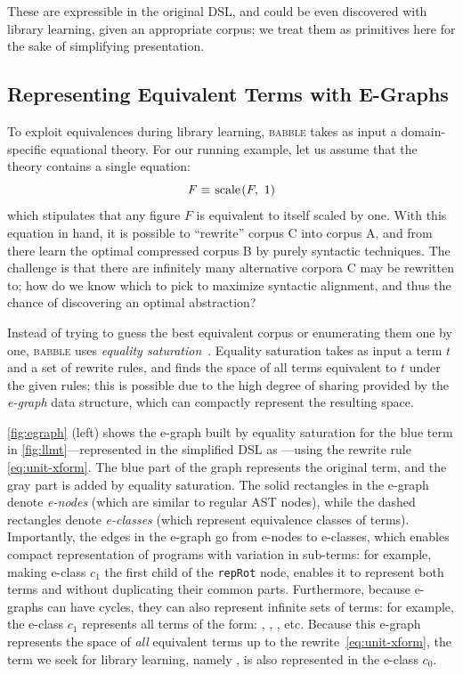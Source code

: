\documentclass[acmsmall,screen,nonacm,review=false,timestamp=false]{acmart}
\newcommand{\tname}[1]{\textsc{#1}\xspace}
\newcommand{\tool}{\tname{babble}}
\newcommand{\T}[1]{\mbox{\lstinline^#1^}}
\newcommand{\semeq}{\equiv}
\begin{document}
\noindent
These are expressible in the original DSL,
  and could be even discovered with library learning,
  given an appropriate corpus;
  we treat them as primitives here
  for the sake of simplifying presentation.
  

\subsection{Representing Equivalent Terms with E-Graphs}

To exploit equivalences during library learning,
\tool takes as input a domain-specific equational theory.
For our running example,
  let us assume that the theory contains a single equation:
\begin{equation}
  F \semeq \scale{F}{1} \label{eq:unit-xform}
\end{equation}
  which stipulates that any figure $F$
  is equivalent to itself 
scaled by one.
With this equation in hand,
  it is possible to ``rewrite'' corpus C into corpus A,
  and from there learn the optimal compressed corpus B
  by purely syntactic techniques.
The challenge
  is that there are infinitely many
  alternative corpora C may be rewritten to;
  how do we know which to pick to maximize syntactic alignment,
  and thus the chance of discovering an optimal abstraction?

Instead of trying to guess
  the best equivalent corpus
  or enumerating them one by one,
  \tool uses \emph{equality saturation}~\cite{tate2009equality,willsey2021egg}.
Equality saturation takes as input
  a term $t$ and a set of rewrite rules,
  and finds the space of all terms equivalent
  to $t$ under the given rules;
  this is possible due to the high degree of
  sharing provided by the \emph{e-graph} data structure,
  which can compactly represent the resulting space.

\autoref{fig:egraph} (left) shows the e-graph
  built by equality saturation for the blue term in \autoref{fig:llmt}---represented in the simplified DSL as ---using the rewrite rule \eqref{eq:unit-xform}.
The blue part of the graph represents the original term,
  and the gray part is added by equality saturation.
The solid rectangles in the e-graph denote
  \emph{e-nodes} (which are similar to regular AST nodes),
  while the dashed rectangles denote
  \emph{e-classes} (which represent equivalence classes of terms).
Importantly,
  the edges in the e-graph go from e-nodes to e-classes,
  which enables compact representation of
  programs with variation in sub-terms:
  for example, making e-class $c_1$
  the first child of the \T{repRot} node,
  enables it to represent both terms
and
without duplicating their common parts.
Furthermore, because e-graphs can have cycles,
  they can also represent infinite sets of terms:
  for example, the e-class $c_1$ represents
  all terms of the form:
  ,
  ,
  ,
  etc.
Because this e-graph represents
  the space of \emph{all} equivalent terms
  up to the rewrite~\eqref{eq:unit-xform},
  the term we seek for library learning, namely
    ,
is also represented in the e-class $c_0$.
\end{document}
